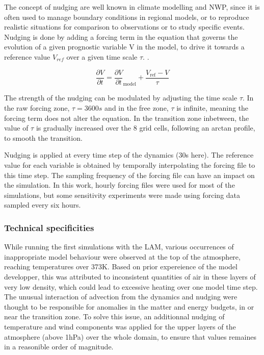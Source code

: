 The concept of nudging are well known in climate modelling and NWP, since it is often used to manage boundary conditions in regional models, or to reproduce realistic situations for comparison to observations or to study specific events. Nudging is done by adding a forcing term in the equation that governs the evolution of a given prognostic variable V in the model, to drive it towards a reference value $V_{ref}$ over a given time scale $\tau$.
. %

\begin{equation}
    \frac{\partial V}{\partial t} = \frac{\partial V}{\partial t}_{\text{model}}+ \frac{V_{\text{ref}} - V}{\tau}
\end{equation}

The strength of the nudging can be modulated by adjusting the time scale $\tau$.
In the raw forcing zone, $\tau = 3600s$ and in the free zone, $\tau$ is infinite, meaning the forcing term does not alter the equation. In the transition zone inbetween, the value of $\tau$ is gradually increased over the 8 grid cells, following an arctan profile, to smooth the transition.

Nudging is applied at every time step of the dynamics (30s here). The reference value for each variable is obtained by temporally interpolating the forcing file to this time step. The sampling frequency of the forcing file can have an impact on the simulation. In this work, hourly forcing files were used for most of the simulations, but some sensitivity experiments were made using forcing data sampled every six hours.

\subsubsection{Technical specificities}

While running the first simulations with the LAM, various occurrences of inappropriate model behaviour were observed at the top of the atmosphere, reaching temperatures over 373K. Based on prior expereience of the model developper, this was attributed to inconsistent quantities of air in these layers of very low density, which could lead to excessive heating over one model time step. The unusual interaction of advection from the dynamics and nudging were thought to be responsible for anomalies in the matter and energy budgets, in or near the transition zone.
To solve this issue, an additionnal nudging of temperature and wind components was applied for the upper layers of the atmosphere (above 1hPa) over the whole domain, to ensure that values remaines in a reasonible order of magnitude. 

